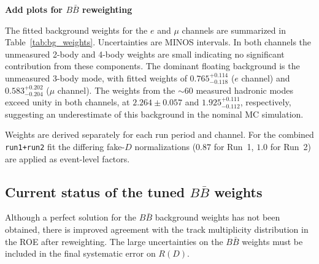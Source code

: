 {\bf Add plots for $B \bar{B}$ reweighting}


The fitted background weights for the $e$ and $\mu$ channels are summarized
in Table~\ref{tab:bg_weights}. Uncertainties are MINOS intervals. 
In both channels the unmeasured 2-body and 4-body weights are small
indicating no significant contribution from
these components. The dominant floating background is the unmeasured 3-body
mode, with fitted weights of $0.765^{+0.114}_{-0.118}$ ($e$ channel) and
$0.583^{+0.202}_{-0.204}$ ($\mu$ channel). The weights from the $\sim 60$ measured hadronic modes
exceed unity in both channels, at $2.264 \pm 0.057$ and
$1.925^{+0.111}_{-0.112}$, respectively, suggesting an underestimate of
this background in the nominal MC simulation. 


Weights are derived separately for each run period and channel.
For the combined \texttt{run1+run2} fit the differing fake-$D$ normalizations
($0.87$ for Run~1, $1.0$ for Run~2) are applied as event-level factors.


\subsection{Current status of the tuned $B\bar{B}$ weights}
\label{sec:bbbar:results}


Although a perfect solution for the $B\bar{B}$ background weights has not been obtained, there is improved
agreement with the track multiplicity distribution in the ROE after reweighting. The large uncertainties on the $B \bar{B}$ weights must be included in the final systematic error on $R(D)$.




